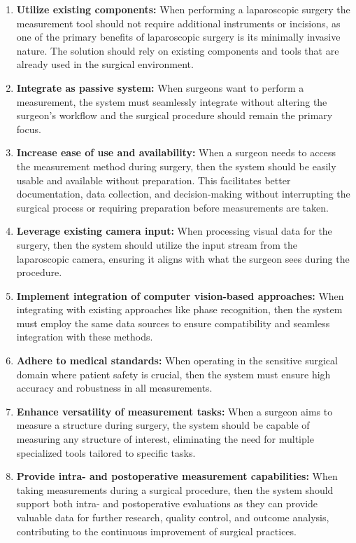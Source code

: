 \documentclass[letterpaper]{article} %
\begin{document}
\begin{enumerate}

\item[R1] \textbf{Utilize existing components:} When performing a laparoscopic surgery the measurement tool should not require additional instruments or incisions, as one of the primary benefits of laparoscopic surgery is its minimally invasive nature. The solution should rely on existing components and tools that are already used in the surgical environment.

\item[R2] \textbf{Integrate as passive system:} When surgeons want to perform a measurement, the system must seamlessly integrate without altering the surgeon's workflow and the surgical procedure should remain the primary focus.

\item[R3] \textbf{Increase ease of use and availability:} When a surgeon needs to access the measurement method during surgery, then the system should be easily usable and available without preparation. This facilitates better documentation, data collection, and decision-making without interrupting the surgical process or requiring preparation before measurements are taken.

\item[R4] \textbf{Leverage existing camera input:} When processing visual data for the surgery, then the system should utilize the input stream from the laparoscopic camera, ensuring it aligns with what the surgeon sees during the procedure.

\item[R5] \textbf{Implement integration of computer vision-based approaches:} When integrating with existing approaches like phase recognition, then the system must employ the same data sources to ensure compatibility and seamless integration with these methods.

\item[R6] \textbf{Adhere to medical standards:} When operating in the sensitive surgical domain where patient safety is crucial, then the system must ensure high accuracy and robustness in all measurements.

\item[R7] \textbf{Enhance versatility of measurement tasks:} When a surgeon aims to measure a structure during surgery, the system should be capable of measuring any structure of interest, eliminating the need for multiple specialized tools tailored to specific tasks.

\item[R8] \textbf{Provide intra- and postoperative measurement capabilities:} When taking measurements during a surgical procedure, then the system should support both intra- and postoperative evaluations as they can provide valuable data for further research, quality control, and outcome analysis, contributing to the continuous improvement of surgical practices.

\end{enumerate}
\end{document}
